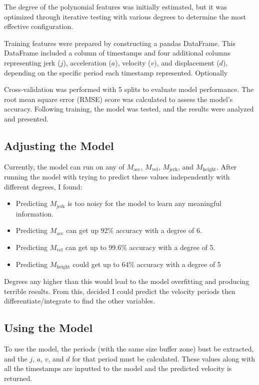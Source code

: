 \documentclass[12pt,a4paper]{article}
\begin{document}
The degree of the polynomial features was initially estimated, but it was optimized through iterative testing with various degrees to determine the most effective configuration.

Training features were prepared by constructing a pandas DataFrame. This DataFrame included a column of timestamps and four additional columns representing jerk ($j$), acceleration ($a$), velocity ($v$), and displacement ($d$), depending on the specific period each timestamp represented. Optionally

Cross-validation was performed with 5 splits to evaluate model performance. The root mean square error (RMSE) score was calculated to assess the model's accuracy. Following training, the model was tested, and the results were analyzed and presented.

 
\subsection{Adjusting the Model}
Currently, the model can run on any of $M_{\text{acc}}$, $M_{\text{vel}}$, $M_{\text{jerk}}$, and $M_{\text{height}}$.
After running the model with trying to predict these values independently with different degrees, I found:
 \begin{itemize}
     \item Predicting $M_{\text{jerk}}$ is too noisy for the model to learn any meaningful information.
     \item Predicting $M_{\text{acc}}$ can get up 92\% accuracy with a degree of 6.
     \item Predicting $M_{\text{vel}}$ can get up to 99.6\% accuracy with a degree of 5.
     \item Predicting $M_{\text{height}}$ could get up to 64\% accuracy with a degree of 5
 \end{itemize}
Degrees any higher than this would lead to the model overfitting and producing terrible results.
From this, decided I could predict the velocity periods then differentiate/integrate to find the other variables.

\subsection{Using the Model}
To use the model, the periods (with the same size buffer zone) bust be extracted, and the $j$, $a$, $v$, and $d$ for that period must be calculated. These values along with all the timestamps are inputted to the model and the predicted velocity is returned.
\end{document}
